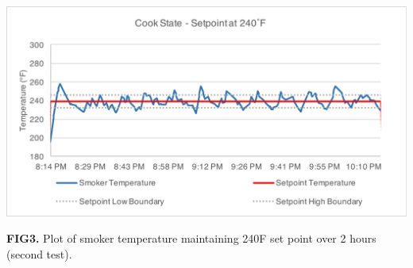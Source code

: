 \documentclass{article}
\begin{document}
\begin{center}
\includegraphics[scale=.95]{temphold}
\centering
\end{center}
\textbf{FIG3.} Plot of smoker temperature maintaining 240\degree F set point over 2 hours (second test). 
\end{document}
